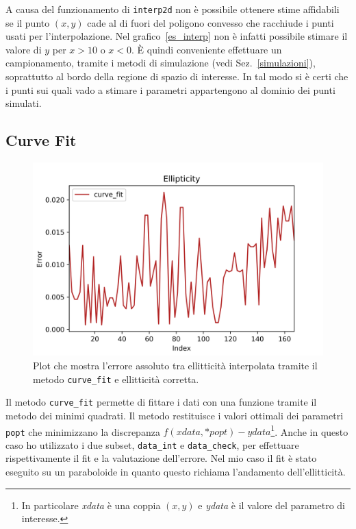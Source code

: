\documentclass[12pt,a4paper,final]{book}
\begin{document}
A causa del funzionamento di \texttt{interp2d} non è possibile ottenere stime affidabili se il punto $(x, y)$ cade al di fuori del poligono convesso che racchiude i punti usati per l'interpolazione. Nel grafico~\ref{es_interp} non è infatti possibile stimare il valore di $y$ per $x>10$ o $x<0$.
\`E quindi conveniente effettuare un campionamento, tramite i metodi di simulazione (vedi Sez.~\ref{simulazioni}), soprattutto al bordo della regione di spazio di interesse. In tal modo si è certi che i punti sui quali vado a stimare i parametri appartengono al dominio dei punti simulati.


\subsection{Curve Fit}\label{curve_fit}
\begin{figure}[!ht]
	\centering
	\includegraphics[scale=0.7]{../figures/error_curve_fit.png}
	\caption{Plot che mostra l'errore assoluto tra ellitticità interpolata tramite il metodo \texttt{curve\_fit} e ellitticità corretta.}
	\label{err_curve_fit}
\end{figure}
Il metodo \texttt{curve\_fit} permette di fittare i dati con una funzione tramite il metodo dei minimi quadrati. Il metodo restituisce i valori ottimali dei parametri \texttt{popt} che minimizzano la discrepanza $f(xdata, *popt) - ydata$\footnote{In particolare \textit{xdata} è una coppia $(x,y)$ e \textit{ydata} è il valore del parametro di interesse.}. Anche in questo caso ho utilizzato i due subset, \texttt{data\_int} e \texttt{data\_check}, per effettuare rispettivamente il fit e la valutazione dell'errore. Nel mio caso il fit è stato eseguito su un paraboloide in quanto questo richiama l'andamento dell'ellitticità.
\end{document}
